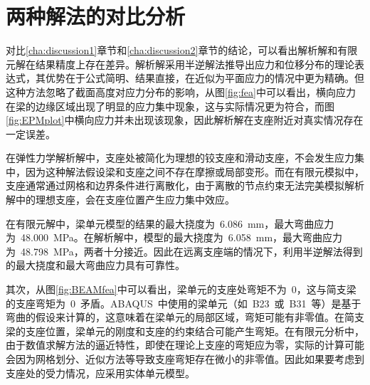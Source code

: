 \chapter{两种解法的对比分析}
\label{cha:comparison}
对比\ref{cha:discussion1}章节和\ref{cha:discussion2}章节的结论，可以看出解析解和有限元解在结果精度上存在差异。解析解采用半逆解法推导出应力和位移分布的理论表达式，其优势在于公式简明、结果直接，在近似为平面应力的情况中更为精确。但这种方法忽略了截面高度对应力分布的影响，从图\ref{fig:fea}中可以看出，横向应力在梁的边缘区域出现了明显的应力集中现象，这与实际情况更为符合，而图\ref{fig:EPMplot}中横向应力并未出现该现象，因此解析解在支座附近对真实情况存在一定误差。

在弹性力学解析解中，支座处被简化为理想的铰支座和滑动支座，不会发生应力集中，因为这种解法假设梁和支座之间不存在摩擦或局部变形。而在有限元模拟中，支座通常通过网格和边界条件进行离散化，由于离散的节点约束无法完美模拟解析解中的理想支座，会在支座位置产生应力集中效应。

在有限元解中，梁单元模型的结果的最大挠度为~6.086~mm，最大弯曲应力为~48.000~MPa。在解析解中，模型的最大挠度为~6.058~mm，最大弯曲应力为~48.798~MPa，两者十分接近。因此在远离支座端的情况下，利用半逆解法得到的最大挠度和最大弯曲应力具有可靠性。

其次，从图\ref{fig:BEAMfea}中可以看出，梁单元的支座处弯矩不为~0，这与简支梁的支座弯矩为~0~矛盾。ABAQUS~中使用的梁单元（如~B23~或~B31~等）是基于弯曲的假设来计算的，这意味着在梁单元的局部区域，弯矩可能有非零值。在简支梁的支座位置，梁单元的刚度和支座的约束结合可能产生弯矩。在有限元分析中，由于数值求解方法的逼近特性，即使在理论上支座的弯矩应为零，实际的计算可能会因为网格划分、近似方法等导致支座弯矩存在微小的非零值。因此如果要考虑到支座处的受力情况，应采用实体单元模型。